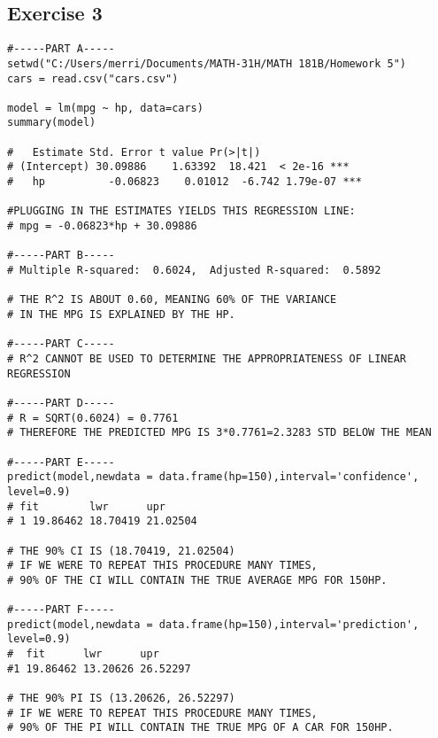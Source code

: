 \documentclass{article}
\begin{document}
\subsection*{Exercise 3}
\begin{lstlisting}
#-----PART A-----
setwd("C:/Users/merri/Documents/MATH-31H/MATH 181B/Homework 5")
cars = read.csv("cars.csv")

model = lm(mpg ~ hp, data=cars)
summary(model)

#   Estimate Std. Error t value Pr(>|t|)    
# (Intercept) 30.09886    1.63392  18.421  < 2e-16 ***
#   hp          -0.06823    0.01012  -6.742 1.79e-07 ***

#PLUGGING IN THE ESTIMATES YIELDS THIS REGRESSION LINE:
# mpg = -0.06823*hp + 30.09886

#-----PART B-----
# Multiple R-squared:  0.6024,	Adjusted R-squared:  0.5892

# THE R^2 IS ABOUT 0.60, MEANING 60% OF THE VARIANCE 
# IN THE MPG IS EXPLAINED BY THE HP. 

#-----PART C-----
# R^2 CANNOT BE USED TO DETERMINE THE APPROPRIATENESS OF LINEAR REGRESSION

#-----PART D-----
# R = SQRT(0.6024) = 0.7761 
# THEREFORE THE PREDICTED MPG IS 3*0.7761=2.3283 STD BELOW THE MEAN

#-----PART E-----
predict(model,newdata = data.frame(hp=150),interval='confidence', level=0.9)
# fit        lwr      upr
# 1 19.86462 18.70419 21.02504

# THE 90% CI IS (18.70419, 21.02504)
# IF WE WERE TO REPEAT THIS PROCEDURE MANY TIMES, 
# 90% OF THE CI WILL CONTAIN THE TRUE AVERAGE MPG FOR 150HP.

#-----PART F-----
predict(model,newdata = data.frame(hp=150),interval='prediction', level=0.9)
#  fit      lwr      upr
#1 19.86462 13.20626 26.52297

# THE 90% PI IS (13.20626, 26.52297)
# IF WE WERE TO REPEAT THIS PROCEDURE MANY TIMES, 
# 90% OF THE PI WILL CONTAIN THE TRUE MPG OF A CAR FOR 150HP.
\end{lstlisting}
\end{document}
